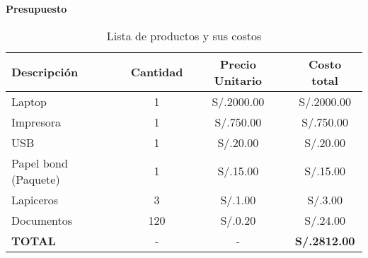 \begin{presupuesto}
\clearpage
\textbf{\Large{Presupuesto}}

\begin{table}[h!]
    \caption{Lista de productos y sus costos}
    \begin{tabular}{|l|c|c|c|}
        \hline
        \textbf{Descripción} & \textbf{Cantidad} & \textbf{Precio Unitario} & \textbf{Costo total} \\
        \hline
        Laptop & 1 & S/.2000.00 & S/.2000.00 \\
        \hline
        Impresora & 1 & S/.750.00 & S/.750.00 \\
        \hline
        USB & 1 & S/.20.00 & S/.20.00 \\
        \hline
        Papel bond (Paquete) & 1 & S/.15.00 & S/.15.00 \\
        \hline
        Lapiceros & 3 & S/.1.00 & S/.3.00 \\
        \hline
        Documentos & 120 & S/.0.20 & S/.24.00 \\
        \hline
        \textbf{TOTAL} & - & - & \textbf{S/.2812.00} \\
        \hline
    \end{tabular}
    
\end{table}

\end{presupuesto}